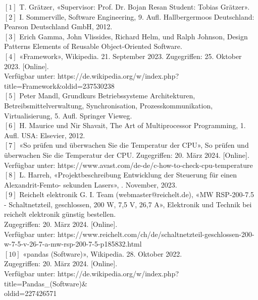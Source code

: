 $[1]$ T. Grätzer, «Supervisor: Prof. Dr. Bojan Resan Student: Tobias Grätzer».\\

$[2]$	I. Sommerville, Software Engineering, 9. Aufl. Hallbergermoos Deutschland: Pearson Deutschland GmbH, 2012.\\

$[3]$	Erich Gamma, John Vlissides, Richard Helm, und Ralph Johnson, Design Patterns Elements of Reusable Object-Oriented Software. \\

$[4]$	«Framework», Wikipedia. 21. September 2023. Zugegriffen: 25. Oktober 2023. [Online].\\
Verfügbar unter: https://de.wikipedia.org/w/index.php?title=Framework\&oldid=237530238\\

$[5]$	Peter Mandl, Grundkurs Betriebssysteme Architekturen, Betreibsmittelverwaltung, Synchronisation, Prozesskommunikation, Virtualisierung, 5. Aufl. Springer Vieweg.\\

$[6]$ H. Maurice und Nir Shavait, The Art of Multiprocessor Programming, 1. Aufl. USA: Elsevier, 2012.\\

$[7]$	«So prüfen und überwachen Sie die Temperatur der CPU», So prüfen und überwachen Sie die Temperatur der CPU. Zugegriffen: 20. März 2024. [Online].\\
Verfügbar unter: https://www.avast.com/de-de/c-how-to-check-cpu-temperature\\

$[8]$	L. Harreh, «Projektbeschreibung Entwicklung der Steuerung für einen Alexandrit-Femto- sekunden Lasers», . November, 2023.\\

$[9]$	 Reichelt elektronik G. I. Team (webmaster@reichelt.de), «MW RSP-200-7.5 - Schaltnetzteil, geschlossen, 200 W, 7,5 V, 26,7 A», Elektronik und Technik bei reichelt elektronik günstig bestellen.\\
Zugegriffen: 20. März 2024. [Online].\\
Verfügbar unter: https://www.reichelt.com/ch/de/schaltnetzteil-geschlossen-200-\\ w-7-5-v-26-7-a-mw-rsp-200-7-5-p185832.html\\

$[10]$	«pandas (Software)», Wikipedia. 28. Oktober 2022.\\
Zugegriffen: 20. März 2024. [Online].\\
Verfügbar unter: https://de.wikipedia.org/w/index.php?title=Pandas\_(Software)\&\\oldid=227426571\\

